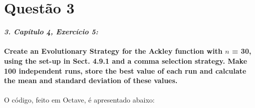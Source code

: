 \documentclass{report}
\begin{document}
	\section*{Questão 3}
	
	\textbf{\textit{3. Capítulo 4, Exercício 5:}}\\\\
	
	\textbf{Create an Evolutionary Strategy for the Ackley function with $n$ = 30, using the set-up in Sect. 4.9.1 and a comma selection strategy. Make 100 independent runs, store the best value of each run and calculate the mean and standard deviation of these values.}
	
	\paragraph{} O código, feito em Octave, é apresentado abaixo:\\
	
\end{document}
